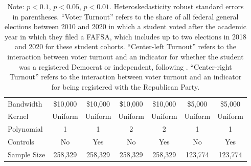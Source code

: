\documentclass[12pt,letterpaper,oneside]{book}
\begin{document}
\begin{table}[h!]
\begin{tabular}{l*{6}{c}}
        \hline
        Bandwidth & \$10,000       &   \$10,000        &   \$10,000        &   \$10,000       &   \$5,000        &   \$5,000        \\
        Kernel&   Uniform      &   Uniform        &   Uniform        &   Uniform       &   Uniform       &   Uniform       \\
        Polynomial&   1       &   1        &   2        &   2       &   1       &   1       \\
        Controls&   No       &   Yes        &   No        &   Yes        &   No        &   Yes        \\
        Sample Size      &   258,329     &    258,329      &      258,329      &   258,329    &   123,774       &   123,774        \\
        \hline
    \end{tabular}
    \caption*{\footnotesize Note: \sym{+} \(p<0.1\), \sym{*} \(p<0.05\), \sym{**} \(p<0.01\). Heteroskedasticity robust standard errors in parentheses. ``Voter Turnout'' refers to the share of all federal general elections between 2010 and 2020 in which a student voted after the academic year in which they filed a FAFSA, which includes up to two elections in 2018 and 2020 for these student cohorts. ``Center-left Turnout'' refers to the interaction between voter turnout and an indicator for whether the student was a registered Democrat or independent, following \cite{firoozi_effect_2023}.  ``Center-right Turnout'' refers to the interaction between voter turnout and an indicator for being registered with the Republican Party.}
\end{table}

\clearpage
\end{document}
